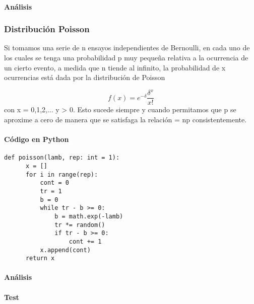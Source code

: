 \documentclass{article}
\begin{document}
  \paragraph{Análisis}

  \subsubsection{Distribución Poisson}
  Si tomamos una serie de n ensayos independientes de Bernoulli, en cada uno de los cuales se tenga una probabilidad p muy pequeña relativa a la ocurrencia de un cierto evento,
  a medida que n tiende al infinito, la probabilidad de x ocurrencias está dada por la distribución de Poisson

  \begin{equation}
    f(x) = e^{-\delta}\frac{\delta^x}{x!}
    \end{equation}
  con x = 0,1,2,... y \delta > 0.
  Esto sucede siempre y cuando permitamos que p se aproxime a cero de manera que se satisfaga la relación \delta = np consistentemente.


  \paragraph{Código en Python}
  \begin{lstlisting}[style = Python]
    def poisson(lamb, rep: int = 1):
      x = []
      for i in range(rep):
          cont = 0
          tr = 1
          b = 0
          while tr - b >= 0:
              b = math.exp(-lamb)
              tr *= random()
              if tr - b >= 0:
                  cont += 1
          x.append(cont)
      return x
  \end{lstlisting}

  \paragraph{Análisis}

  \paragraph{Test}
\end{document}
